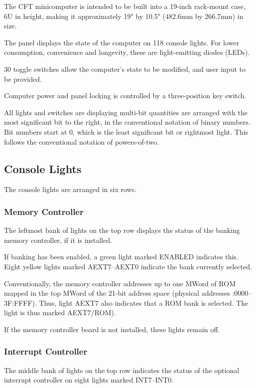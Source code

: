 \documentclass[11pt,a4paper,twocolumns]{article}
\newcommand{\lt}[1]{\textsf{#1}}
\begin{document}
The CFT minicomputer is intended to be built into a 19-inch rack-mount case, 6U
in height, making it approximately 19" by 10.5" (482.6mm by 266.7mm) in size.

The panel displays the state of the computer on 118 console lights. For lower
consumption, convenience and longevity, these are light-emitting diodes (LEDs).

30 toggle switches allow the computer's state to be modified, and user input to
be provided.

Computer power and panel locking is controlled by a three-position key switch.

All lights and switches are displaying multi-bit quantities are arranged with
the most significant bit to the right, in the conventional notation of binary
numbers. Bit numbers start at 0, which is the least significant bit or
rightmost light. This follows the conventional notation of powers-of-two.

\subsection{Console Lights}

The console lights are arranged in six rows.

\subsubsection{Memory Controller}

The leftmost bank of lights on the top row displays the status of the banking
memory controller, if it is installed.

If banking has been enabled, a green light marked \lt{ENABLED} indicates
this. Eight yellow lights marked \lt{AEXT7}–\lt{AEXT0} indicate the bank
currently selected.

Conventionally, the memory controller addresses up to one MWord of ROM mapped
in the top MWord of the 21-bit address space (physical addresses {:0000}–{\sf 3F:FFFF}). Thus, light \lt{AEXT7} also indicates that a ROM
bank is selected. The light is thus marked \lt{AEXT7/ROM}).

If the memory controller board is not installed, these lights remain off.

\subsubsection{Interrupt Controller}

The middle bank of lights on the top row indicates the status of the optional
interrupt controller on eight lights marked \lt{INT7}–\lt{INT0}.
\end{document}
